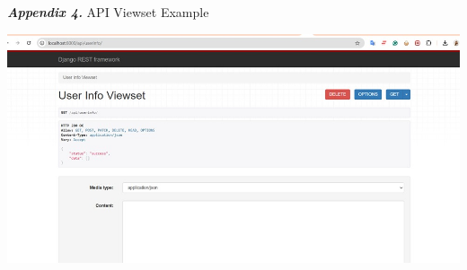 \documentclass[letterpaper,twocolumn]{article}
\newcommand{\myparagraph}[1]{\vspace{0.1cm}\noindent \textbf{\textit{#1.}}}
\begin{document}
\clearpage
\myparagraph{Appendix 4} API Viewset Example
\vspace{2ex}

\includegraphics[scale=0.5]{images/WhatsApp Image 2024-12-13 at 16.01.10.jpeg}\\[0.1cm] 
\end{document}
